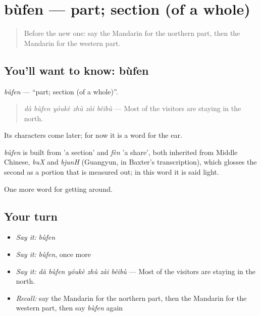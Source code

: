 \section[bùfen]{bùfen — part; section (of a whole)}

\label{lesson:ZH-C438-bufen}



\begin{quote}
Before the new one: say the Mandarin for the northern part, then the Mandarin for the western part.
\end{quote}

\subsection*{You'll want to know: bùfen}
\emph{bùfen} — \textquotedblleft{}part; section (of a whole)\textquotedblright{}.

\begin{quote}
\emph{dà bùfen yóukè zhù zài běibù} — Most of the visitors are staying in the north.
\end{quote}

Its characters come later; for now it is a word for the ear.

\begin{cousinweb}
\emph{bùfen} is built from  'a section' and \emph{fèn} 'a share', both inherited from Middle Chinese, \emph{buX} and \emph{bjunH} (Guangyun, in Baxter's transcription), which glosses the second as a portion that is measured out; in this word it is said light.
\end{cousinweb}

\begin{grammarlens}[title={What you've built}]
One more word for getting around.
\end{grammarlens}

\subsection*{Your turn}
\begin{itemize}
\raggedright
  \item \emph{Say it:} \emph{bùfen}
  \item \emph{Say it:} \emph{bùfen}, once more
  \item \emph{Say it:} \emph{dà bùfen yóukè zhù zài běibù} — Most of the visitors are staying in the north.
  \item \emph{Recall:} say the Mandarin for the northern part, then the Mandarin for the western part, then say \emph{bùfen} again
\end{itemize}

